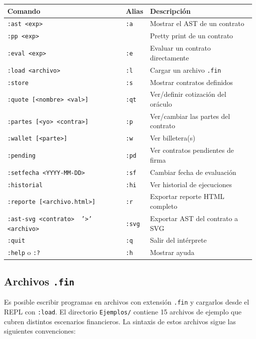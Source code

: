 \documentclass[a4paper, 12pt]{article}
\begin{document}
\begin{center}
\begin{tabular}{l l l}
\toprule
\textbf{Comando} & \textbf{Alias} & \textbf{Descripción} \\
\midrule
\texttt{:ast <exp>} & \texttt{:a} & Mostrar el AST de un contrato \\
\texttt{:pp <exp>} & & Pretty print de un contrato \\
\texttt{:eval <exp>} & \texttt{:e} & Evaluar un contrato directamente \\
\texttt{:load <archivo>} & \texttt{:l} & Cargar un archivo \texttt{.fin} \\
\texttt{:store} & \texttt{:s} & Mostrar contratos definidos \\
\texttt{:quote [<nombre> <val>]} & \texttt{:qt} & Ver/definir cotización del oráculo \\
\texttt{:partes [<yo> <contra>]} & \texttt{:p} & Ver/cambiar las partes del contrato \\
\texttt{:wallet [<parte>]} & \texttt{:w} & Ver billetera(s) \\
\texttt{:pending} & \texttt{:pd} & Ver contratos pendientes de firma \\
\texttt{:setfecha <YYYY-MM-DD>} & \texttt{:sf} & Cambiar fecha de evaluación \\
\texttt{:historial} & \texttt{:hi} & Ver historial de ejecuciones \\
\texttt{:reporte [<archivo.html>]} & \texttt{:r} & Exportar reporte HTML completo \\
\texttt{:ast-svg <contrato> \texttt{ '>'} <archivo>} & \texttt{:svg} & Exportar AST del contrato a SVG \\
\texttt{:quit} & \texttt{:q} & Salir del intérprete \\
\texttt{:help} o \texttt{:?} & \texttt{:h} & Mostrar ayuda \\
\bottomrule
\end{tabular}
\end{center}

\subsection{Archivos \texttt{.fin}}

Es posible escribir programas en archivos con extensión \texttt{.fin} y cargarlos desde el REPL con \texttt{:load}. El directorio \texttt{Ejemplos/} contiene 15 archivos de ejemplo que cubren distintos escenarios financieros. La sintaxis de estos archivos sigue las siguientes convenciones:
\end{document}
